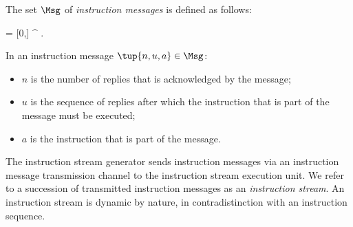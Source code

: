 \documentclass[fleqn]{llncs}
\begin{document}
The set $\Msg$ of \emph{instruction messages} is defined as follows:
\begin{ldispl}
\Msg = [0,\maxlen] \x \Bool^{\leq \maxlen} \x \BActi\;.
\end{ldispl}
In an instruction message $\tup{n,u,a} \in \Msg$:
\begin{itemize}
\item
$n$ is the number of replies that is acknowledged by the message;
\item
$u$ is the sequence of replies after which the instruction that is part
of the message must be executed;
\item
$a$ is the instruction that is part of the message.
\end{itemize}
The instruction stream generator sends instruction messages via an
instruction message transmission channel to the instruction stream
execution unit.
We refer to a succession of transmitted instruction messages as an
\emph{instruction stream}.
An instruction stream is dynamic by nature, in contradistinction with an
instruction sequence.
\end{document}
